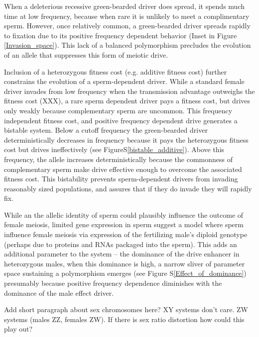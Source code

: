 \documentclass[12pt,letterpaper]{article}
\newcommand{\gc}[1]{{ \color{red} #1}}
\newcommand{\yb}[1]{{ \color{blue} #1}}
\begin{document}
When a deleterious recessive green-bearded driver does spread, 
	it spends much time at low frequency, because when rare it is unlikely to meet a complimentary sperm. 
However, once relatively common, a green-bearded driver spreads rapidly to fixation due to its
	positive frequency dependent behavior (Inset in Figure \ref{Invasion_space}).  
This lack of a balanced polymorphism precludes the evolution of an allele that suppresses this form of meiotic drive.





Inclusion of a heterozygous fitness cost (e.g. additive fitness cost) further constrains the evolution of a sperm-dependent driver. 
While a  standard female  driver invades from low frequency when the transmission advantage outweighs the fitness cost (XXX),
	a rare sperm dependent driver pays a fitness cost, but drives only weakly because complementary sperm are uncommon. 
This frequency independent fitness cost, and positive frequency dependent drive generates a bistable system. 
Below a cutoff frequency the green-bearded driver deterministically decreases in frequency 
	because it pays the  heterozygous fitness cost  but drives ineffectively (see FigureS\ref{bistable_additive}). 
Above this frequency, the allele increases deterministically because the commonness of complementary sperm 
	make drive effective enough to overcome the associated fitness cost.
This bistability prevents sperm-dependent drivers from invading 	
	reasonably sized populations, and assures that if they do invade they will rapidly fix.

While an the allelic identity of sperm could plausibly influence the outcome of female meiosis, 
	limited gene expression in sperm \citep[e.g.][]{Joseph2004}
	suggest a model where sperm influence female meiosis via expression of the fertilizing male's
	diploid genotype (perhaps due to proteins and RNAs packaged into the sperm).
This adds an additional parameter to the system -- the dominance of the drive enhancer in heterozygous males, 
	when this dominance is high, a narrow sliver of parameter space sustaining a polymorphism emerges (see Figure S\ref{Effect_of_dominance})
 	\yb{presumably because positive frequency dependence diminishes with the dominance of the male effect driver.}

\gc{Add short paragraph about sex chromosomes here? XY systems don't care. ZW systems (males ZZ, females ZW). If there is
sex ratio distortion how could this play out?}
\end{document}
